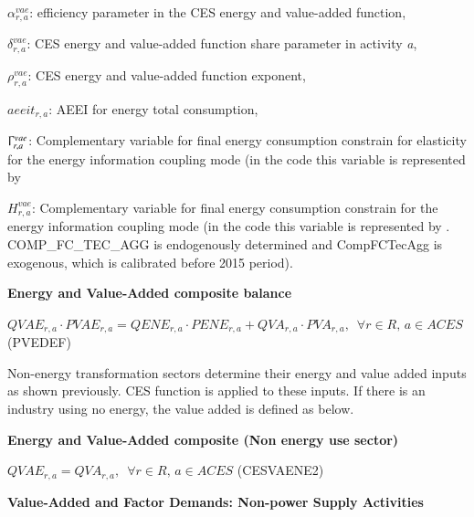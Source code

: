 \documentclass[10pt,a4paper,titlepage,dvipdfmx]{book}
\begin{document}
\begin{flushleft}
$\alpha _{r,a}^{vae}$: efficiency parameter in the CES energy and value-added function,

$\delta _{r,a}^{vae}$: CES energy and value-added function share parameter in activity \textit{a},

$\rho _{r,a}^{vae}$: CES energy and value-added function exponent,

$aeeit_{r,a}$: AEEI for energy total consumption,

$\Upgamma _{r,a}^{vae}$: Complementary variable for final energy consumption constrain for elasticity for the energy information coupling mode (in the code this variable is represented by 

$H _{r,a}^{vae}$: Complementary variable for final energy consumption constrain for the energy information coupling mode (in the code this variable is represented by . COMP\_FC\_TEC\_AGG  is endogenously determined and CompFCTecAgg is exogenous, which is calibrated before 2015 period).
\end{flushleft}

\begin{flushleft}\textbf{Energy and Value-Added composite balance}\end{flushleft}


\begin{center}$QVAE_{r,a}\cdot PVAE_{r,a}=QENE_{r,a}\cdot PENE_{r,a}+QVA_{r,a}\cdot PVA_{r,a},\,\,\,\forall r\in R,\,a\in ACES$ (PVEDEF)
\end{center}

Non-energy transformation sectors determine their energy and value added inputs as shown previously. CES function is applied to these inputs. If there is an industry using no energy, the value added is defined as below.

\begin{flushleft}\textbf{Energy and Value-Added composite (Non energy use sector)}\end{flushleft}


\begin{center}$QVAE_{r,a}=QVA_{r,a},\,\,\,\forall r\in R,\,a\in ACES$ (CESVAENE2)
\end{center}

\begin{flushleft}\textbf{Value-Added and Factor Demands: Non-power Supply Activities}\end{flushleft}
\end{document}
